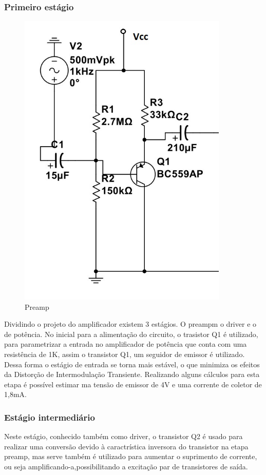 \documentclass[a4paper,12pt,oneside,openany,table,xcdraw]{article}
\begin{document}
\subsubsection{Primeiro estágio} %
\begin{figure}[H]
\centering
\includegraphics[width=10cm]{multisim-1.jpg}
\caption{Preamp}
\label{multisim-1}
\end{figure}

Dividindo o projeto do amplificador existem 3 estágios. O preampm o driver e o de potência. No inicial para a alimentação do circuito, o trasistor Q1 é utilizado, para parametrizar a entrada no amplificador de potência que conta com uma resistência de 1K, assim o transistor Q1, um seguidor de emissor é utilizado. Dessa forma o estágio de entrada se torna mais estável, o que minimiza os efeitos da Distorção de Intermodulação Transiente.
Realizando alguns cálculos para esta etapa é possível estimar ma tensão de emissor de 4V e uma corrente de coletor de 1,8mA.

\subsubsection{Estágio intermediário}
Neste estágio, conhecido também como driver, o transistor Q2 é usado para realizar uma conversão devido à caractrística inversora do transistor na etapa preamp, mas serve também é utilizado para aumentar o suprimento de corrente, ou seja amplificando-a,possibilitando a excitação  par de transistores de saída. 
\end{document}
